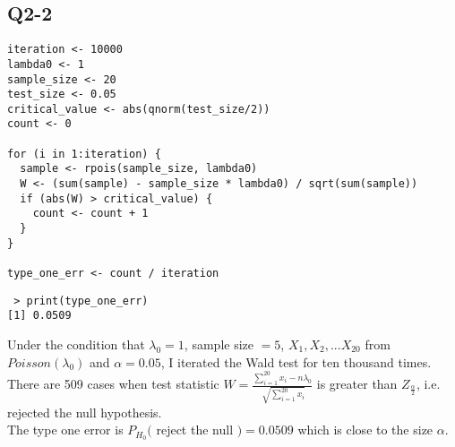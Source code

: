 \documentclass[12pt,letterpaper]{article}
\begin{document}
\subsection*{Q2-2}

\begin{verbatim}
iteration <- 10000
lambda0 <- 1
sample_size <- 20
test_size <- 0.05
critical_value <- abs(qnorm(test_size/2))
count <- 0

for (i in 1:iteration) {
  sample <- rpois(sample_size, lambda0)
  W <- (sum(sample) - sample_size * lambda0) / sqrt(sum(sample))
  if (abs(W) > critical_value) {
    count <- count + 1
  } 
}

type_one_err <- count / iteration
\end{verbatim}

\begin{verbatim}
 > print(type_one_err)
[1] 0.0509
\end{verbatim}

\noindent Under the condition that $\lambda_0 = 1$, sample size $= 5 $, $X_1, X_2, ... X_{20}$ from $Poisson(\lambda_0)$ and $\alpha = 0.05$, I iterated the Wald test for ten thousand times. \\

\noindent There are 509 cases when test statistic $W = \frac{\sum_{i=1}^{20} x_i - n \lambda_0}{\sqrt[]{\sum_{i=1}^{20} x_i}} $ is greater than $Z_{\frac{\alpha}{2}}$, i.e. rejected the null hypothesis. \\

\noindent The type one error is $P_{H_0}($ reject the null $) = 0.0509$ which is close to the size $\alpha$.
\end{document}
